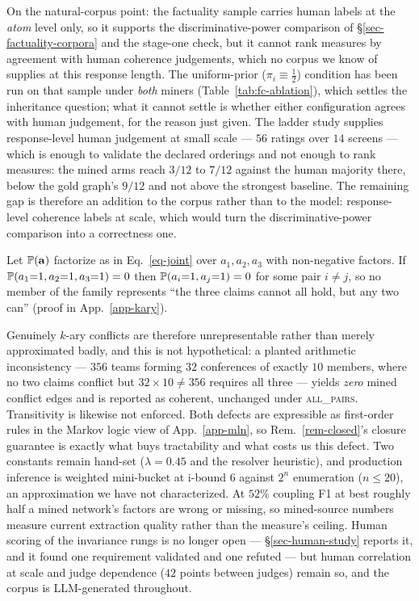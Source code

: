 On the natural-corpus point: the factuality sample carries human labels at the \emph{atom} level only, so it
supports the discriminative-power comparison of \S\ref{sec-factuality-corpora} and the stage-one check, but it
cannot rank measures by agreement with human coherence judgements, which no corpus we know of supplies at this
response length. The uniform-prior ($\pi_i\equiv\tfrac12$) condition has been run on that sample under
\emph{both} miners (Table~\ref{tab:fc-ablation}), which settles the inheritance question; what it cannot
settle is whether either configuration agrees with human judgement, for the reason just given. The ladder study
supplies response-level human judgement at small scale --- $56$ ratings over $14$ screens --- which is enough to
validate the declared orderings and not enough to rank measures: the mined arms reach $3/12$ to $7/12$ against
the human majority there, below the gold graph's $9/12$ and not above the strongest baseline. The remaining gap
is therefore an addition to the corpus rather than to the model: response-level coherence labels at scale, which
would turn the discriminative-power comparison into a correctness one.

\begin{proposition}
\label{prop-kary}
Let $\mathbb{P}\!\left( \mathbf{a} \right)$ factorize as in Eq.~\ref{eq-joint} over $a_1,a_2,a_3$ with non-negative factors. If
$\mathbb{P}\!\left( a_1{=}1,a_2{=}1,a_3{=}1 \right)=0$ then $\mathbb{P}\!\left( a_i{=}1,a_j{=}1 \right)=0$ for some pair $i\neq j$, so no member of the
family represents ``the three claims cannot all hold, but any two can'' (proof in App.~\ref{app-kary}).
\end{proposition}

Genuinely $k$-ary conflicts are therefore unrepresentable rather than merely approximated badly, and this is not
hypothetical: a planted arithmetic inconsistency --- $356$ teams forming $32$ conferences of exactly $10$
members, where no two claims conflict but $32\times10\neq356$ requires all three --- yields \emph{zero} mined
conflict edges and is reported as coherent, unchanged under \textsc{all\_pairs}. Transitivity is likewise not
enforced. Both defects are expressible as first-order rules in the Markov logic view of App.~\ref{app-mln}, so
Rem.~\ref{rem-closed}'s closure guarantee is exactly what buys tractability and what costs us this defect. Two constants
remain hand-set ($\lambda=0.45$ and the resolver heuristic), and production inference is weighted mini-bucket at
i-bound $6$ against $2^n$ enumeration ($n\le20$), an approximation we have not characterized. At $52\%$ coupling F1 at best roughly half a mined network's factors are wrong or missing, so
mined-source numbers measure current extraction quality rather than the measure's ceiling. Human scoring of the
invariance rungs is no longer open --- \S\ref{sec-human-study} reports it, and it found one requirement validated
and one refuted --- but human correlation at scale and judge dependence ($42$ points between judges) remain so,
and the corpus is LLM-generated throughout.

